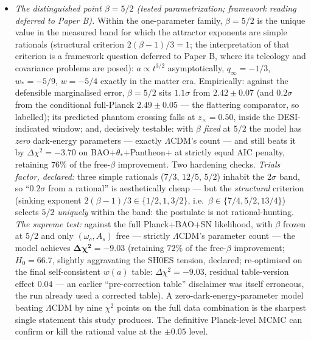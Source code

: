 \documentclass[11pt]{article}
\begin{document}
\begin{itemize}
\item[P10.] \emph{The distinguished point $\beta = 5/2$ (tested parametrization; framework reading deferred to Paper B).} Within the one-parameter family, $\beta = 5/2$ is the unique value in the measured band for which the attractor exponents are simple rationals (structural criterion $2(\beta-1)/3 = 1$; the interpretation of that criterion is a framework question deferred to Paper B, where its teleology and covariance problems are posed): $a \propto t^{3/2}$ asymptotically, $q_\infty = -1/3$, $w_* = -5/9$, $w = -5/4$ exactly in the matter era. Empirically: against the defensible marginalised error, $\beta = 5/2$ sits $1.1\sigma$ from $2.42 \pm 0.07$ (and $0.2\sigma$ from the conditional full-Planck $2.49 \pm 0.05$ --- the flattering comparator, so labelled); its predicted phantom crossing falls at $z_\times = 0.50$, inside the DESI-indicated window; and, decisively testable: with $\beta$ \emph{fixed} at $5/2$ the model has \emph{zero} dark-energy parameters --- exactly $\Lambda$CDM's count --- and still beats it by $\Delta\chi^2 = -3.70$ on BAO+$\theta_*$+Pantheon+ at strictly equal AIC penalty, retaining $76\%$ of the free-$\beta$ improvement. Two hardening checks. \emph{Trials factor, declared:} three simple rationals ($7/3$, $12/5$, $5/2$) inhabit the $2\sigma$ band, so ``$0.2\sigma$ from a rational'' is aesthetically cheap --- but the \emph{structural} criterion (sinking exponent $2(\beta-1)/3 \in \{1/2, 1, 3/2\}$, i.e.\ $\beta \in \{7/4, 5/2, 13/4\}$) selects $5/2$ \emph{uniquely} within the band: the postulate is not rational-hunting. \emph{The supreme test:} against the full Planck+BAO+SN likelihood, with $\beta$ frozen at $5/2$ and only $(\omega_c, A_s)$ free --- strictly $\Lambda$CDM's parameter count --- the model achieves $\boldsymbol{\Delta\chi^2 = -9.03}$ (retaining $72\%$ of the free-$\beta$ improvement; $H_0 = 66.7$, slightly aggravating the SH0ES tension, declared; re-optimised on the final self-consistent $w(a)$ table: $\Delta\chi^2 = -9.03$, residual table-version effect $0.04$ --- an earlier ``pre-correction table'' disclaimer was itself erroneous, the run already used a corrected table). A zero-dark-energy-parameter model beating $\Lambda$CDM by nine $\chi^2$ points on the full data combination is the sharpest single statement this study produces. The definitive Planck-level MCMC can confirm or kill the rational value at the $\pm 0.05$ level.
\end{itemize}
\end{document}
